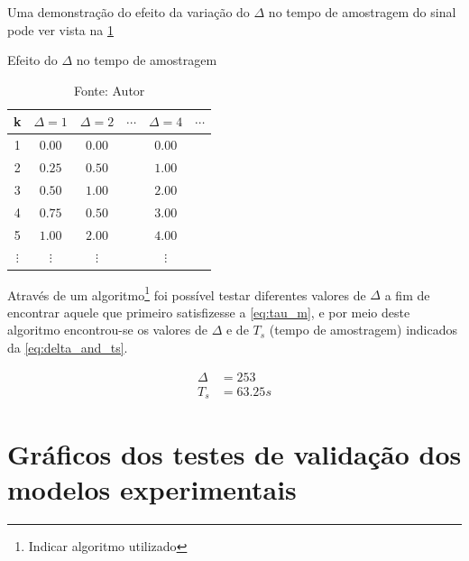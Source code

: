 \begin{apendicesenv}
Uma demonstração do efeito da variação do $\Delta$ no tempo de amostragem do sinal
pode ver vista na \cref{tab:delta_action}

\begin{table}[h]
	\centering
	\caption{Efeito do $\Delta$ no tempo de amostragem}
	\label{tab:delta_action}
	\begin{tabular}{cccccc} \toprule
		{k}			& {$\Delta=1$}		& {$\Delta=2$}		& {$\cdots$}	& {$\Delta=4$}	& {$\cdots$} 	\\ \midrule
		1			& $0.00$			& $0.00$			& \hfill		& $0.00$		& \hfill		\\
		2			& $0.25$			& $0.50$			& \hfill		& $1.00$		& \hfill		\\
		3			& $0.50$			& $1.00$			& \hfill		& $2.00$		& \hfill		\\
		4			& $0.75$			& $0.50$			& \hfill		& $3.00$		& \hfill		\\
		5			& $1.00$			& $2.00$			& \hfill		& $4.00$		& \hfill		\\ 
		$\vdots$	& $\vdots$			& $\vdots$			& \hfill		& $\vdots$		& \hfill		\\ \bottomrule 
	\end{tabular}
	\caption*{Fonte: Autor}
\end{table}

Através de um algoritmo\footnote{
	Indicar algoritmo utilizado			%
} foi possível testar diferentes valores de $\Delta$ a fim de encontrar
aquele que primeiro satisfizesse a \cref{eq:tau_m}, e por meio deste algoritmo encontrou-se
os valores de $\Delta$ e de $T_s$ (tempo de amostragem) indicados da \cref{eq:delta_and_ts}.

\begin{subequations}
    \label{eq:delta_and_ts}
    \begin{align}
		\Delta &= 253	\\
		T_s &= 63.25s
    \end{align}
\end{subequations}

\chapter{Gráficos dos testes de validação dos modelos experimentais}
\label{ch:graficos_testes_de_validacao}


\end{apendicesenv}
